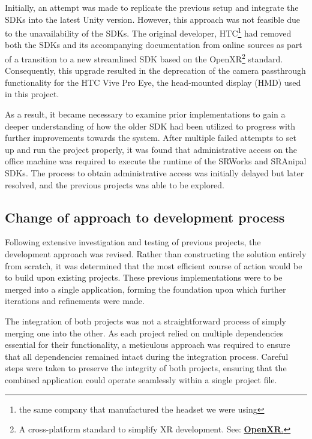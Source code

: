\documentclass{l4proj}
\begin{document}
Initially, an attempt was made to replicate the previous setup and integrate the SDKs into the latest Unity version. However, this approach was not feasible due to the unavailability of the SDKs. The original developer, HTC\footnote{the same company that manufactured the headset we were using} had removed both the SDKs and its accompanying documentation from online sources as part of a transition to a new streamlined SDK based on the OpenXR\footnote{A cross-platform standard to simplify XR development. See: \href{https://www.khronos.org/openxr/\#xr-fragmentation}{\textbf{OpenXR}.}} standard. Consequently, this upgrade resulted in the deprecation of the camera passthrough functionality for the HTC Vive Pro Eye, the head-mounted display (HMD) used in this project.

As a result, it became necessary to examine prior implementations to gain a deeper understanding of how the older SDK had been utilized to progress with further improvements towards the system. After multiple failed attempts to set up and run the project properly, it was found that administrative access on the office machine was required to execute the runtime of the SRWorks and SRAnipal SDKs. The process to obtain administrative access was initially delayed but later resolved, and the previous projects was able to be explored.


\subsection{Change of approach to development process}
Following extensive investigation and testing of previous projects, the development approach was revised. Rather than constructing the solution entirely from scratch, it was determined that the most efficient course of action would be to build upon existing projects. These previous implementations were to be merged into a single application, forming the foundation upon which further iterations and refinements were made.

The integration of both projects was not a straightforward process of simply merging one into the other. As each project relied on multiple dependencies essential for their functionality, a meticulous approach was required to ensure that all dependencies remained intact during the integration process. Careful steps were taken to preserve the integrity of both projects, ensuring that the combined application could operate seamlessly within a single project file.
\end{document}
